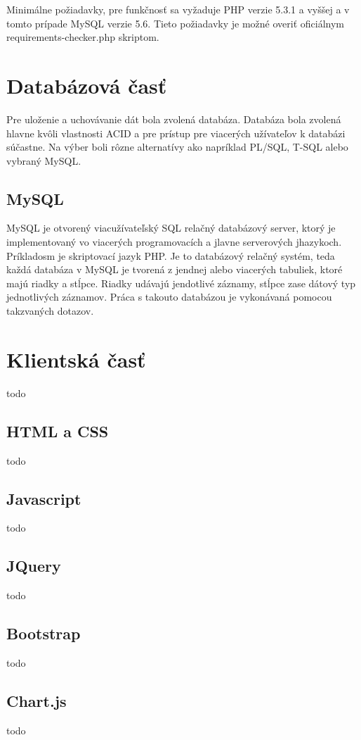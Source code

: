Minimálne požiadavky, pre funkčnosť sa vyžaduje PHP verzie 5.3.1 a vyššej a v tomto prípade MySQL verzie 5.6. Tieto požiadavky je možné overiť oficiálnym requirements-checker.php skriptom.


\section{Databázová časť}
Pre uloženie a uchovávanie dát bola zvolená databáza. Databáza bola zvolená hlavne kvôli vlastnosti ACID a pre prístup pre viacerých užívateľov k databázi súčastne. Na výber boli rôzne alternatívy ako napríklad PL/SQL, T-SQL alebo vybraný MySQL. 

\subsection{MySQL}
MySQL je otvorený viacužívateľský SQL relačný databázový server, ktorý je implementovaný vo viacerých programovacích a jlavne serverových jhazykoch. Príkladosm je skriptovací jazyk PHP. Je to databázový relačný systém, teda každá databáza v MySQL je tvorená z jendnej alebo viacerých tabuliek, ktoré majú riadky a stĺpce. Riadky udávajú jendotlivé záznamy, stĺpce zase dátový typ jednotlivých záznamov. Práca s takouto databázou je vykonávaná pomocou takzvaných dotazov.

\section{Klientská časť}
todo

\subsection{HTML a CSS}
todo

\subsection{Javascript}
todo

\subsection{JQuery}
todo

\subsection{Bootstrap}
todo

\subsection{Chart.js}
todo

